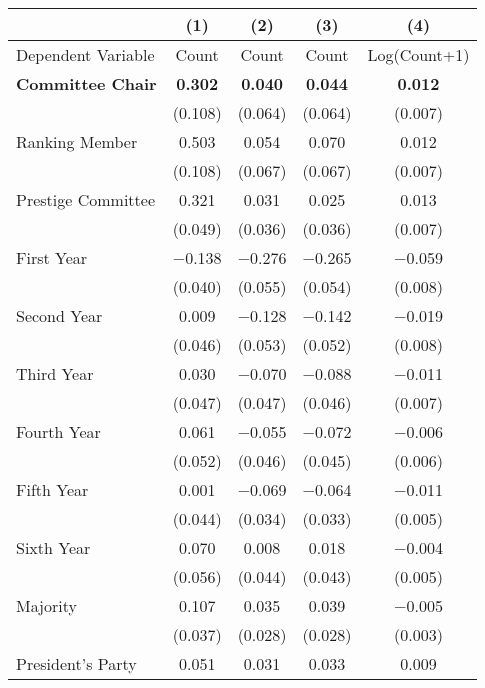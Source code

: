 \begin{tabular}[t]{lcccc}
\toprule
  & (1) & (2) & (3) & (4)\\
\midrule
Dependent Variable & Count & Count & Count & Log(Count+1)\\
\textbf{Committee Chair} & \textbf{\num{0.302}} & \textbf{\num{0.040}} & \textbf{\num{0.044}} & \textbf{\num{0.012}}\\
\midrule
 & (\num{0.108}) & (\num{0.064}) & (\num{0.064}) & (\num{0.007})\\
Ranking Member & \num{0.503} & \num{0.054} & \num{0.070} & \num{0.012}\\
 & (\num{0.108}) & (\num{0.067}) & (\num{0.067}) & (\num{0.007})\\
Prestige Committee & \num{0.321} & \num{0.031} & \num{0.025} & \num{0.013}\\
 & (\num{0.049}) & (\num{0.036}) & (\num{0.036}) & (\num{0.007})\\
First Year & \num{-0.138} & \num{-0.276} & \num{-0.265} & \num{-0.059}\\
 & (\num{0.040}) & (\num{0.055}) & (\num{0.054}) & (\num{0.008})\\
Second Year & \num{0.009} & \num{-0.128} & \num{-0.142} & \num{-0.019}\\
 & (\num{0.046}) & (\num{0.053}) & (\num{0.052}) & (\num{0.008})\\
Third Year & \num{0.030} & \num{-0.070} & \num{-0.088} & \num{-0.011}\\
 & (\num{0.047}) & (\num{0.047}) & (\num{0.046}) & (\num{0.007})\\
Fourth Year & \num{0.061} & \num{-0.055} & \num{-0.072} & \num{-0.006}\\
 & (\num{0.052}) & (\num{0.046}) & (\num{0.045}) & (\num{0.006})\\
Fifth Year & \num{0.001} & \num{-0.069} & \num{-0.064} & \num{-0.011}\\
 & (\num{0.044}) & (\num{0.034}) & (\num{0.033}) & (\num{0.005})\\
Sixth Year & \num{0.070} & \num{0.008} & \num{0.018} & \num{-0.004}\\
 & (\num{0.056}) & (\num{0.044}) & (\num{0.043}) & (\num{0.005})\\
Majority & \num{0.107} & \num{0.035} & \num{0.039} & \num{-0.005}\\
 & (\num{0.037}) & (\num{0.028}) & (\num{0.028}) & (\num{0.003})\\
President's Party & \num{0.051} & \num{0.031} & \num{0.033} & \num{0.009}\\

\end{tabular}
